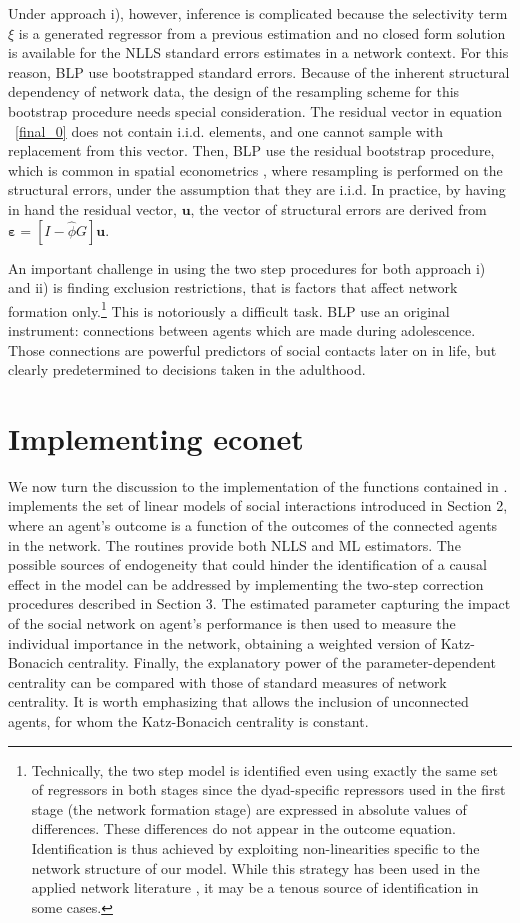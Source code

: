 \documentclass[nojss]{jss}
\begin{document}
Under approach i), however, inference is complicated because the
selectivity term $\xi$ is a generated regressor from a previous estimation and no closed form solution is available for the NLLS standard errors estimates in a network context. For this reason, BLP use bootstrapped standard errors. Because of the inherent structural dependency of network data, the design of the resampling scheme for this bootstrap procedure needs special consideration. The residual vector in equation ~\ref{final_0} does not contain i.i.d. elements, and one cannot sample with replacement from this vector. Then, BLP use the residual bootstrap procedure, which is common in spatial econometrics \citep[see][]{Anselin:1990}, where resampling is performed on the structural errors, under the assumption that they are i.i.d. In practice, by having in hand the residual vector, $\boldsymbol{u}$, the vector of structural errors are derived from $\mathbf{\varepsilon}=[I-\widehat{\phi}G]\boldsymbol{u}$.

An important challenge in using the two step procedures for both approach i) and ii) is finding exclusion restrictions, that is factors that affect network formation only.\footnote{ Technically, the two step model is identified even using exactly the same set of regressors in both stages since the dyad-specific repressors used in the first stage (the network formation stage) are expressed in absolute values of differences. These differences do not appear in the outcome equation. Identification is thus achieved by exploiting non-linearities specific to the network structure of our model. While this strategy has been used in the applied network literature \citep[see e.g.][]{GPI:2013,CSL:2016}, it may be a tenous source of identification in some cases.} This is notoriously a difficult task. BLP use an original instrument: connections between agents which are made during adolescence. Those connections are powerful predictors of social contacts later on in life, but clearly predetermined to decisions taken in the adulthood.

\section{Implementing econet}

We now turn the discussion to the implementation of the functions contained in .  implements the set of linear models of social interactions introduced in Section 2, where an agent's outcome is a function of the outcomes of the connected agents in the network. The routines provide both NLLS and ML estimators. The possible sources of endogeneity that could hinder the identification of a causal effect in the model can be addressed by implementing the two-step
correction procedures described in Section 3. The estimated parameter capturing the impact of the social network on agent's performance is then used to measure the individual importance in the network, obtaining a weighted version of Katz-Bonacich centrality. Finally, the explanatory power of the parameter-dependent centrality can be compared with those of standard measures of network centrality. It is worth emphasizing that  allows the inclusion of unconnected agents, for whom the Katz-Bonacich centrality is constant.
\end{document}
